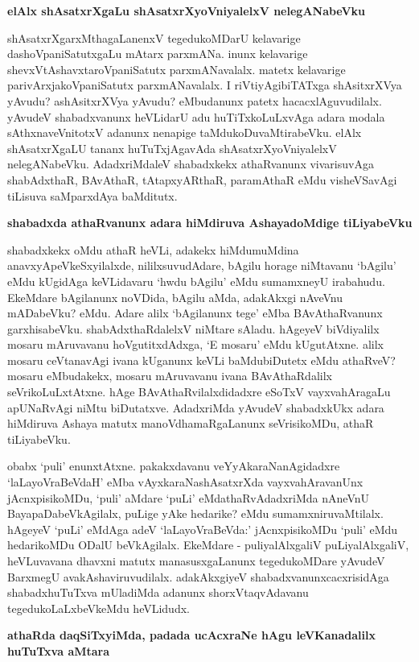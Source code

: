 {\bigskip
\noindent
{\large\bf elAlx shAsatxrXgaLu shAsatxrXyoVniyalelxV nelegANabeVku}}\label{page179}
\medskip

\noindent
shAsatxrXgarxMthagaLanenxV tegedukoMDarU kelavarige dashoVpaniSatutxgaLu mAtarx parxmANa. inunx kelavarige shevxVtAshavxtaroVpaniSatutx parxmANavalalx. matetx kelavarige parivArxja\-koVpaniSatutx parxmANavalalx. I riVtiyAgi\-biTATxga shAsitxrXVya yAvudu? ashAsitxrXVya yAvudu? eMbudanunx patetx hacacxlAguvudilalx. yAvudeV shabadxvanunx heVLidarU adu huTiTxkoLuLxvAga adara modala sAthxnaveVnitotxV adanunx nenapige taMdukoDu\-vaMtirabeVku. elAlx shAsatxrXgaLU tananx huTuTxjAgavAda shAsatxrXyoVniyalelxV nelegANabeVku. Adadx\-riMdaleV shabadxkekx athaRvanunx vivarisuvAga shabAdxthaR, BAvAthaR, tAtapxyARthaR, paramAthaR eMdu visheVSa\-vAgi tiLisuva saMparxdAya baMditutx.

{\bigskip
\noindent
{\large\bf shabadxda athaRvanunx adara hiMdiruva AshayadoMdige tiLiyabeVku}}\label{page179}
\medskip

\noindent
shabadxkekx oMdu athaR heVLi, adakekx hiMdumuMdina anavxyApeVkeSxyilalxde, nililxsuvudAdare, bAgilu\- horage niMtavanu `bAgilu' eMdu kUgidAga keVLidavaru `hwdu bAgilu' eMdu sumamxneyU ira\-bahudu. EkeMdare bAgilanunx noVDida, bAgilu aMda, adakAkxgi nAveVnu mADabeVku? eMdu. Adare alilx `bAgilanunx tege' eMba BAvAthaRvanunx garxhisabeVku. shabAdxthaRdalelxV niMtare sAladu. hAgeyeV biVdiyalilx mosaru mAruvavanu hoVgutitxdAdxga, `E mosaru' eMdu kUgutAtxne. alilx mosaru ceVtana\-vAgi ivana kUganunx keVLi baMdubiDutetx eMdu athaRveV? mosaru eMbudakekx, mosaru mAru\-vavanu ivana BAvAthaRdalilx seVrikoLuLxtAtxne. hAge BAvAthaRvilalxdidadxre eSoTxV vayxvahAragaLu apU\-NaRvAgi niMtu biDutatxve. AdadxriMda yAvudeV shabadxkUkx adara hiMdiruva Ashaya matutx manoV\-dhamaR\-gaLanunx seVrisikoMDu, athaR tiLiyabeVku.

obabx `puli' enunxtAtxne. pakakxdavanu veYyAkaraNanAgidadxre `laLayoVra\-BeVdaH' eMba vAyxkaraNashAsatxrXda vayxvahAravanUnx jAcnxpisikoMDu, `puli' aMdare `puLi' eMdathaRvAdadxriMda nAneVnU BayapaDabeVkA\-gilalx, puLige yAke hedarike? eMdu sumamxniruvaMtilalx. hAgeyeV `puLi' eMdAga adeV `laLayoVra\-BeVda:' jAcnxpisikoMDu `puli' eMdu hedarikoMDu ODalU beVkAgilalx. EkeMdare - puliyalAlxgaliV puLiyalAlxgaliV, heVLuvavana dhavxni matutx manasusxgaLanunx tegedukoMDare yAvudeV BarxmegU ava\-kAsha\-viruvudilalx. adakAkxgiyeV shabadxvanunxcacxrisidAga shabadxhuTuTxva mUladiMda adanunx shorxVtaqvAdavanu tegedukoLaLxbeVkeMdu heVLidudx.

{\bigskip
\noindent
{\large\bf athaRda daqSiTxyiMda, padada ucAcxraNe hAgu leVKanadalilx huTuTxva aMtara}}
\medskip

